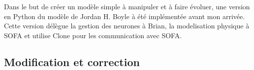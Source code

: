 Dans le but de créer un modèle simple à manipuler et à faire évoluer, une version en Python du
modèle de Jordan H. Boyle à été implémentée avant mon arrivée. Cette version délègue la gestion
des neurones à Brian, la modelisation physique à SOFA et utilise Clone pour les communication
avec SOFA.

\subsection{Modification et correction} %
\label{sub:Modification et correction}




